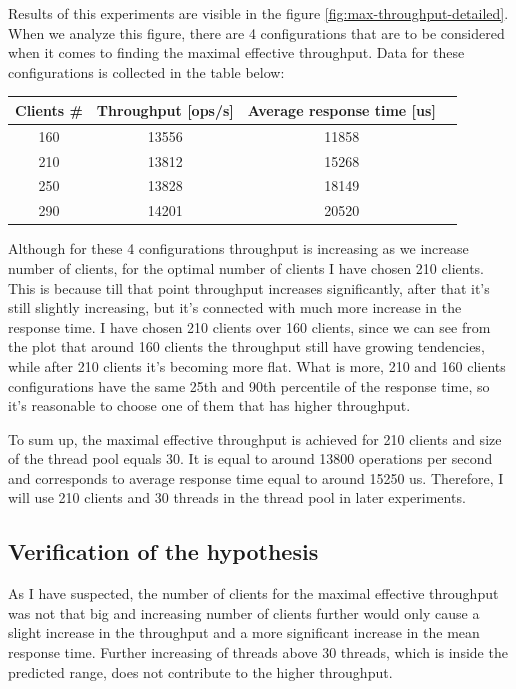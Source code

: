 \documentclass[11pt]{article}
\begin{document}
Results of this experiments are visible in the figure \ref{fig:max-throughput-detailed}. When we analyze this figure, there are 4 configurations that are to be considered when it comes to finding the maximal effective throughput. Data for these configurations is collected in the table below:

\medskip

\begin{tabular}{|c|c|c|c|}
\hline \bf{Clients \#} & \bf{Throughput [ops/s]} &\bf{Average response time [us]}  \\
\hline 160 & 13556 & 11858 \\
\hline 210 & 13812 & 15268 \\
\hline 250 & 13828 & 18149 \\
\hline 290 & 14201 & 20520 \\
\hline
\end{tabular}
\medskip

Although for these 4 configurations throughput is increasing as we increase number of clients, for the optimal number of clients I have chosen 210 clients. This is because till that point throughput increases significantly, after that it's still slightly increasing, but it's connected with much more increase in the response time. I have chosen 210 clients over 160 clients, since we can see from the plot that around 160 clients the throughput still have growing tendencies, while after 210 clients it's becoming more flat. What is more, 210 and 160 clients configurations have the same 25th and 90th percentile of the response time, so it's reasonable to choose one of them that has higher throughput.

To sum up, the maximal effective throughput is achieved for 210 clients and size of the thread pool equals 30. It is equal to around 13800 operations per second and corresponds to average response time equal to around 15250 us. Therefore, I will use 210 clients and 30 threads in the thread pool in later experiments.  

\subsection{Verification of the hypothesis}

As I have suspected, the number of clients for the maximal effective throughput was not that big and increasing number of clients further would only cause a slight increase in the throughput and a more significant increase in the mean response time. Further increasing of threads above 30 threads, which is inside the predicted range, does not contribute to the higher throughput.
\end{document}
